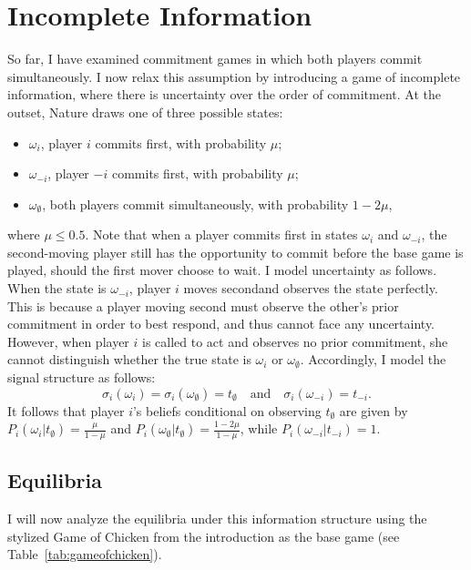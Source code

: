 \documentclass[../paper.tex]{subfiles}
\begin{document}
\section{Incomplete Information}\label{sec:incomplete_info}
So far, I have examined commitment games in which both players commit simultaneously. I now relax this assumption by introducing a game of incomplete information, where there is uncertainty over the order of commitment. 
At the outset, Nature draws one of three possible states:
\begin{itemize}
    \item $\omega_i$, player $i$ commits first, with probability $\mu$;
    \item $\omega_{-i}$, player $-i$ commits first, with probability $\mu$;
    \item $\omega_\emptyset$, both players commit simultaneously, with probability $1-2\mu$,
\end{itemize}
where $\mu \leq 0.5$. Note that when a player commits first in states $\omega_i$ and $\omega_{-i}$, the second-moving player still has the opportunity to commit before the base game is played, should the first mover choose to wait.
I model uncertainty as follows. When the state is $\omega_{-i}$, player $i$ moves secondand observes the state perfectly. This is because a player moving second must observe the other's prior commitment in order to best respond, and thus cannot face any uncertainty.
However, when player $i$ is called to act and observes no prior commitment, she cannot distinguish whether the true state is $\omega_i$ or $\omega_\emptyset$. 
Accordingly, I model the signal structure as follows: 
\[
\sigma_i(\omega_i)=\sigma_i(\omega_\emptyset)=t_\emptyset \quad\text{and}\quad \sigma_i(\omega_{-i})=t_{-i}.
\]
It follows that player $i$'s beliefs conditional on observing $t_\emptyset$ are given by $P_i(\omega_i|t_\emptyset)=\frac{\mu}{1-\mu}$ and $P_i(\omega_\emptyset|t_\emptyset)=\frac{1-2\mu }{1-\mu}$, while $P_i(\omega_{-i}|t_{-i})=1$. 
\subsection*{\centering  Equilibria}
I will now analyze the equilibria under this information structure using the stylized Game of Chicken from the introduction as the base game (see Table~\ref{tab:gameofchicken}).
 
\end{document}
